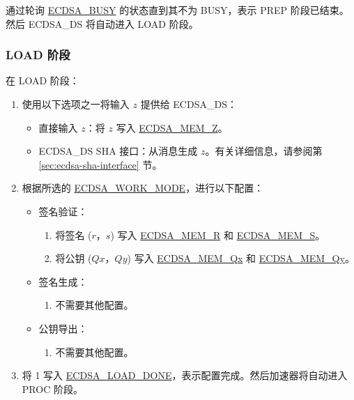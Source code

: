 \documentclass[main\_\_CN.tex]{subfiles}
\begin{document}
通过轮询 \hyperref[fielddesc:ECDSABUSY]{ECDSA\_BUSY} 的状态直到其不为 BUSY，表示 PREP 阶段已结束。然后 ECDSA\_DS 将自动进入 LOAD 阶段。

\subsubsection{LOAD 阶段}
在 LOAD 阶段：

\begin{enumerate}
	\item 使用以下选项之一将输入 $z$ 提供给 ECDSA\_DS：
	      \begin{itemize}
		      \item 直接输入 $z$：将 $z$ 写入 \hyperref[tab:ecdsa-memory]{ECDSA\_MEM\_Z}。
		      \item ECDSA\_DS SHA 接口：从消息生成 $z$。有关详细信息，请参阅第 \ref{sec:ecdsa-sha-interface} 节。
	      \end{itemize}
	\item 根据所选的 \hyperref[fielddesc:ECDSAWORKMODE]{ECDSA\_WORK\_MODE}，进行以下配置：
	      \begin{itemize}
		      \item 签名验证：
		            \begin{enumerate}
			            \item 将签名 ($r$，$s$) 写入 \hyperref[tab:ecdsa-memory]{ECDSA\_MEM\_R} 和 \hyperref[tab:ecdsa-memory]{ECDSA\_MEM\_S}。
			            \item 将公钥 ($Qx$，$Qy$) 写入 \hyperref[tab:ecdsa-memory]{ECDSA\_MEM\_Qx} 和 \hyperref[tab:ecdsa-memory]{ECDSA\_MEM\_Qy}。
		            \end{enumerate}
		      \item 签名生成：
		            \begin{enumerate}
			            \item 不需要其他配置。
		            \end{enumerate}
                \item 公钥导出：
		            \begin{enumerate}
                            \item 不需要其他配置。
		            \end{enumerate}
	      \end{itemize}
	\item 将 1 写入 \hyperref[fielddesc:ECDSALOADDONE]{ECDSA\_LOAD\_DONE}，表示配置完成。然后加速器将自动进入 PROC 阶段。
\end{enumerate}
\end{document}
